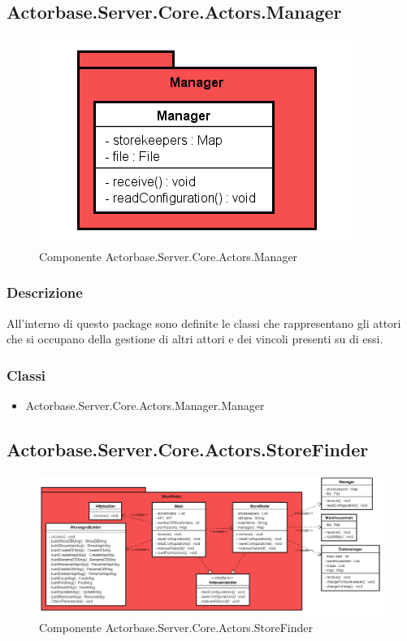\documentclass[a4paper]{article}
\begin{document}
		\subsection{Actorbase.Server.Core.Actors.Manager}
			\begin{figure} [H]
			\centering
			\includegraphics[scale=0.65]{Server/Package/ManagerLevel.png}
			\caption{Componente Actorbase.Server.Core.Actors.Manager}
			\end{figure}
			\subsubsection{Descrizione}
				All'interno di questo package sono definite le classi che rappresentano gli attori che si occupano della gestione di altri attori e dei vincoli presenti su di essi.
			\subsubsection{Classi}
			\begin{itemize}
				\item Actorbase.Server.Core.Actors.Manager.Manager
			\end{itemize}
			
		\subsection{Actorbase.Server.Core.Actors.StoreFinder}
			\begin{figure} [H]
			\centering
			\includegraphics[width=\textwidth]{Server/Package/StorefinderLevel.png}
			\caption{Componente Actorbase.Server.Core.Actors.StoreFinder}
			\end{figure}
\end{document}
